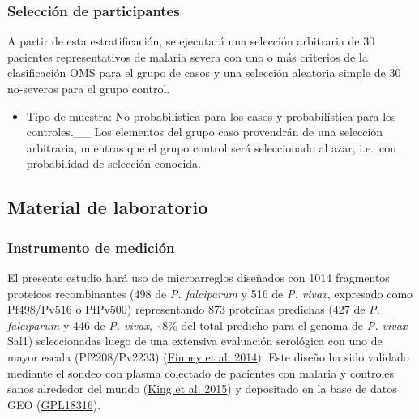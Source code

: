 \documentclass[
  a4paper]{article}
\providecommand{\tightlist}{%
  \setlength{\itemsep}{0pt}\setlength{\parskip}{0pt}}
\begin{document}
\hypertarget{selecciuxf3n-de-participantes}{%
\subsubsection{Selección de
participantes}\label{selecciuxf3n-de-participantes}}

A partir de esta estratificación, se ejecutará una selección arbitraria
de 30 pacientes representativos de malaria severa con uno o más
criterios de la clasificación OMS para el grupo de casos y una selección
aleatoria simple de 30 no-severos para el grupo control.

\begin{itemize}
\tightlist
\item
  Tipo de muestra: No probabilística para los casos y probabilística
  para los controles.\_\_ Los elementos del grupo caso provendrán de una
  selección arbitraria, mientras que el grupo control será seleccionado
  al azar, i.e.~con probabilidad de selección conocida.
\end{itemize}

\hypertarget{material-de-laboratorio}{%
\subsection{Material de laboratorio}\label{material-de-laboratorio}}

\hypertarget{instrumento-de-mediciuxf3n}{%
\subsubsection{Instrumento de
medición}\label{instrumento-de-mediciuxf3n}}

El presente estudio hará uso de microarreglos diseñados con 1014
fragmentos proteicos recombinantes (498 de \emph{P. falciparum} y 516 de
\emph{P. vivax}, expresado como Pf498/Pv516 o PfPv500) representando 873
proteínas predichas (427 de \emph{P. falciparum} y 446 de \emph{P.
vivax}, \textasciitilde8\% del total predicho para el genoma de \emph{P.
vivax} Sal1) seleccionadas luego de una extensiva evaluación serológica
con uno de mayor escala (Pf2208/Pv2233)
(\protect\hyperlink{ref-Finney2014}{Finney et al. 2014}). Este diseño ha
sido validado mediante el sondeo con plasma colectado de pacientes con
malaria y controles sanos alrededor del mundo
(\protect\hyperlink{ref-King2015FOC}{King et al. 2015}) y depositado en
la base de datos GEO
(\href{https://www.ncbi.nlm.nih.gov/geo/query/acc.cgi?acc=GPL18316}{GPL18316}).
\end{document}
